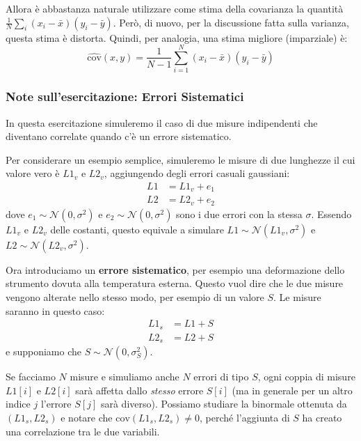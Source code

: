 \documentclass[openany,a4paper,12pt]{book}
\theoremstyle{remark}
\begin{document}
Allora è abbastanza naturale utilizzare come stima della covarianza la quantità $\frac{1}{N} \sum_{i} (x_i - \bar{x})(y_i - \bar{y})$. 
Però, di nuovo, per la discussione fatta sulla varianza, questa stima è distorta. Quindi, per analogia, una stima migliore (imparziale) è:
\begin{equation}
\hat{\text{cov}}(x,y) = \frac{1}{N-1} \sum_{i=1}^N (x_i - \bar{x})(y_i - \bar{y})
\end{equation}


\subsubsection*{Note sull'esercitazione: Errori Sistematici}
In questa esercitazione simuleremo il caso di due misure indipendenti che diventano correlate quando c'è un errore sistematico.

Per considerare un esempio semplice, simuleremo le misure di due lunghezze il cui valore vero è $L1_v$ e $L2_v$, aggiungendo degli errori casuali gaussiani:
\begin{align*}
L1 &= L1_v + e_1 \\
L2 &= L2_v + e_2
\end{align*}
dove $e_1 \sim \mathcal{N}(0, \sigma^2)$ e $e_2 \sim \mathcal{N}(0, \sigma^2)$ sono i due errori con la stessa $\sigma$. 
Essendo $L1_v$ e $L2_v$ delle costanti, questo equivale a simulare $L1 \sim \mathcal{N}(L1_v, \sigma^2)$ e $L2 \sim \mathcal{N}(L2_v, \sigma^2)$.

Ora introduciamo un \textbf{errore sistematico}, per esempio una deformazione dello strumento dovuta alla temperatura esterna. Questo vuol dire che le due misure vengono alterate nello stesso modo, per esempio di un valore $S$. Le misure saranno in questo caso:
\begin{align*}
L1_s &= L1 + S \\
L2_s &= L2 + S
\end{align*}
e supponiamo che $S \sim \mathcal{N}(0, \sigma_S^2)$.

Se facciamo $N$ misure e simuliamo anche $N$ errori di tipo $S$, ogni coppia di misure $L1[i]$ e $L2[i]$ sarà affetta dallo \emph{stesso} errore $S[i]$ (ma in generale per un altro indice $j$ l'errore $S[j]$ sarà diverso).
Possiamo studiare la binormale ottenuta da $(L1_s, L2_s)$ e notare che $\text{cov}(L1_s, L2_s) \neq 0$, perché l'aggiunta di $S$ ha creato una correlazione tra le due variabili.
\end{document}
